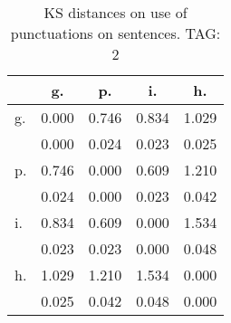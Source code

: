 \begin{table}[h!]
\begin{center}
\begin{tabular}{| l | c | c | c | c |}\hline
 & g. & p. & i. & h. \\\hline
g. & 0.000  & 0.746  & 0.834  & 1.029 \\\hline
 & 0.000  & 0.024  & 0.023  & 0.025 \\\hline
p. & 0.746  & 0.000  & 0.609  & 1.210 \\\hline
 & 0.024  & 0.000  & 0.023  & 0.042 \\\hline
i. & 0.834  & 0.609  & 0.000  & 1.534 \\\hline
 & 0.023  & 0.023  & 0.000  & 0.048 \\\hline
h. & 1.029  & 1.210  & 1.534  & 0.000 \\\hline
 & 0.025  & 0.042  & 0.048  & 0.000 \\\hline
\end{tabular}
\caption{KS distances on use of punctuations on sentences. TAG: 2}
\end{center}
\end{table}